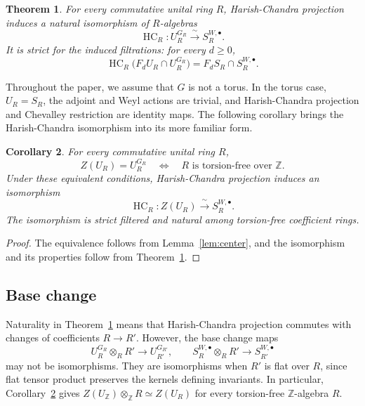 \documentclass[twoside,a4paper,12pt,reqno]{amsart}
\newtheorem{theorem}{Theorem}[section]
\newtheorem{corollary}[theorem]{Corollary}
\theoremstyle{remark}
\numberwithin{equation}{section}
\newcommand{\Z}{\mathbb Z}
\DeclareMathOperator{\HC}{HC}
\newcommand{\iso}{\xrightarrow{\ \sim\ }}
\begin{document}
\begin{theorem}\label{thm:main}
For every commutative unital ring \(R\), Harish-Chandra projection induces a natural isomorphism of \(R\)-algebras
\[
\HC_R:U_R^{G_R}\iso S_R^{W,\bullet}.
\]
It is strict for the induced filtrations: for every \(d\ge0\),
\[
\HC_R\bigl(F_dU_R\cap U_R^{G_R}\bigr)
=F_dS_R\cap S_R^{W,\bullet}.
\]
\end{theorem}

Throughout the paper, we assume that \(G\) is not a torus. In the torus case, \(U_R=S_R\), the adjoint and Weyl actions are trivial, and Harish-Chandra projection and Chevalley restriction are identity maps.
The following corollary brings the Harish-Chandra isomorphism into its more familiar form.

\begin{corollary}\label{cor:fullcenter}
For every commutative unital ring \(R\),
\[
Z(U_R)=U_R^{G_R}
\quad\Longleftrightarrow\quad
R\text{ is torsion-free over }\Z.
\]
Under these equivalent conditions, Harish-Chandra projection induces an isomorphism
\[
\HC_R:Z(U_R)\iso S_R^{W,\bullet}.
\]
The isomorphism is strict filtered and natural among torsion-free coefficient rings.
\end{corollary}
\begin{proof}
The equivalence follows from Lemma~\ref{lem:center}, and the isomorphism and its properties follow from Theorem~\ref{thm:main}.
\end{proof}



\subsection{Base change}\label{subsec:sl2example}

Naturality in Theorem~\ref{thm:main} means that Harish-Chandra projection commutes with changes
of coefficients \(R\to R'\). However,
the base change maps
\[
U_R^{G_R}\otimes_RR'\longrightarrow U_{R'}^{G_{R'}},\qquad
S_R^{W,\bullet}\otimes_RR'\longrightarrow S_{R'}^{W,\bullet}
\]
may not be isomorphisms. They are isomorphisms when \(R'\) is flat
over \(R\), since flat tensor product preserves the kernels defining
invariants. In particular, Corollary~\ref{cor:fullcenter} gives
\(Z(U_{\Z})\otimes_{\Z}R\simeq Z(U_R)\) for every torsion-free
\(\Z\)-algebra \(R\).
\end{document}
